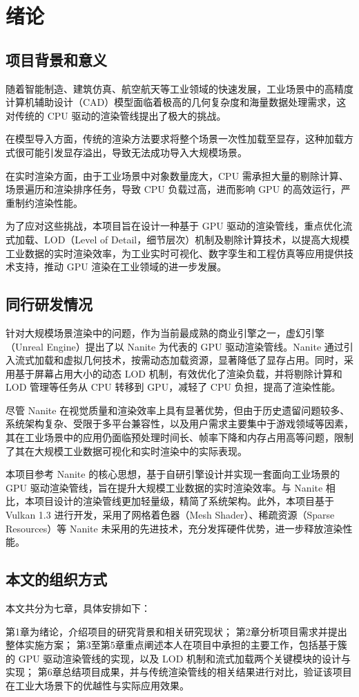 \cleardoublepage

\section{绪论}

\subsection{项目背景和意义}
随着智能制造、建筑仿真、航空航天等工业领域的快速发展，工业场景中的高精度计算机辅助设计（CAD）模型面临着极高的几何复杂度和海量数据处理需求，这对传统的 CPU 驱动的渲染管线提出了极大的挑战。

在模型导入方面，传统的渲染方法要求将整个场景一次性加载至显存，这种加载方式很可能引发显存溢出，导致无法成功导入大规模场景。

在实时渲染方面，由于工业场景中对象数量庞大，CPU 需承担大量的剔除计算、场景遍历和渲染排序任务，导致 CPU 负载过高，进而影响 GPU 的高效运行，严重制约渲染性能\cite{WangWei2011}。

为了应对这些挑战，本项目旨在设计一种基于 GPU 驱动的渲染管线，重点优化流式加载、LOD（Level of Detail，细节层次）机制及剔除计算技术，以提高大规模工业数据的实时渲染效率，为工业实时可视化、数字孪生和工程仿真等应用提供技术支持，推动 GPU 渲染在工业领域的进一步发展。

\subsection{同行研发情况}

针对大规模场景渲染中的问题，作为当前最成熟的商业引擎之一，虚幻引擎（Unreal Engine）提出了以 Nanite 为代表的 GPU 驱动渲染管线\cite{Nanite2022}。Nanite 通过引入流式加载和虚拟几何技术，按需动态加载资源，显著降低了显存占用。同时，采用基于屏幕占用大小的动态 LOD 机制\cite{Overton2024}，有效优化了渲染负载，并将剔除计算和 LOD 管理等任务从 CPU 转移到 GPU，减轻了 CPU 负担，提高了渲染性能。

尽管 Nanite 在视觉质量和渲染效率上具有显著优势，但由于历史遗留问题较多、系统架构复杂、受限于多平台兼容性，以及用户需求主要集中于游戏领域等因素，其在工业场景中的应用仍面临预处理时间长、帧率下降和内存占用高等问题，限制了其在大规模工业数据可视化和实时渲染中的实际表现。

本项目参考 Nanite 的核心思想，基于自研引擎设计并实现一套面向工业场景的 GPU 驱动渲染管线，旨在提升大规模工业数据的实时渲染效率。与 Nanite 相比，本项目设计的渲染管线更加轻量级，精简了系统架构。此外，本项目基于 Vulkan 1.3 进行开发，采用了网格着色器（Mesh Shader）、稀疏资源（Sparse Resources）等 Nanite 未采用的先进技术，充分发挥硬件优势，进一步释放渲染性能。

\subsection{本文的组织方式}

本文共分为七章，具体安排如下：

第1章为绪论，介绍项目的研究背景和相关研究现状；
第2章分析项目需求并提出整体实施方案；  
第3至第5章重点阐述本人在项目中承担的主要工作，包括基于簇的 GPU 驱动渲染管线的实现，以及 LOD 机制和流式加载两个关键模块的设计与实现；
第6章总结项目成果，并与传统渲染管线的相关结果进行对比，验证该项目在工业大场景下的优越性与实际应用效果。